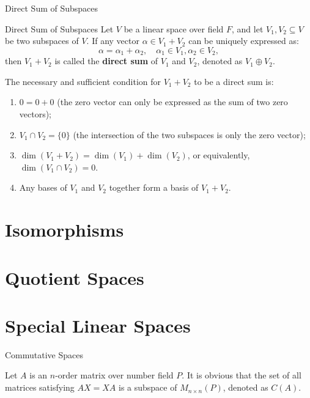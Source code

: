 \documentclass[11pt]{../../TexTemplate/elegantbook} %
\begin{document}
\begin{leftbarTitle}{Direct Sum of Subspaces}\end{leftbarTitle}
\begin{definition}{Direct Sum of Subspaces}
    Let \( V \) be a linear space over field \( F \), 
    and let \( V_1, V_2 \subseteq V \) be two subspaces of \( V \).
    If any vector \( \alpha \in V_1 + V_2 \) can be uniquely expressed as:
    \[
    \alpha = \alpha_1 + \alpha_2, \quad \alpha_1 \in V_1, \alpha_2 \in V_2,
    \]
    then \( V_1 + V_2 \) is called the \textbf{direct sum} of \( V_1 \) and \( V_2 \),
    denoted as \( V_1 \oplus V_2 \).
\end{definition}

\begin{proposition}
    The necessary and sufficient condition for \( V_1 + V_2 \) to be a direct sum is:
    \begin{enumerate}
        \item \(0 = 0 + 0\) (the zero vector can only be expressed as the sum of two zero vectors); 
        \item \( V_1 \cap V_2 = \{0\} \) (the intersection of the two subspaces is only the zero vector);
        \item \(\operatorname{dim}(V_{1}+V_{2})=\operatorname{dim}(V_{1})+\operatorname{dim}(V_{2})\),
            or equivalently, \(\operatorname{dim}(V_{1} \cap V_{2})=0\).
        \item Any bases of \( V_1 \) and \( V_2 \) together form a basis of \( V_1 + V_2 \).
    \end{enumerate}
\end{proposition}




\section{Isomorphisms}

\section{Quotient Spaces}

\section{Special Linear Spaces}
\begin{leftbarTitle}{Commutative Spaces}\end{leftbarTitle}
Let \( A \) is an \( n \)-order matrix over number field \( P \).
It is obvious that the set of all matrices satisfying \( AX = XA \) is a subspace of \( M_{n \times n}(P) \),
denoted as \( C(A) \).
\end{document}
